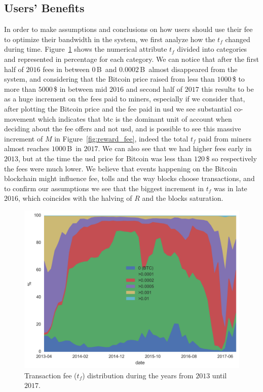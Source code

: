 \documentclass[USenglish]{uit-thesis}
\def\bitcoin{\leavevmode\rlap{\hskip.5pt-}B}
\begin{document}
\subsection{Users' Benefits} %
\label{sec:userbenefits}
In order to make assumptions and conclusions on how
users should use their fee to optimize their bandwidth in
the system, we first analyze how the $t_f$ changed during
time. Figure~\ref{fig:txs_fee_distribution} shows the numerical
attribute $t_f$ divided into categories and
represented in percentage for each category.
We can notice that after the first half of $2016$
fees in between $0$\,\bitcoin~and $0.0002$\,\bitcoin~almost disappeared
from the system, and considering that the Bitcoin price raised
from less than $1000$\,\$ to more than $5000$\,\$ in between
mid $2016$ and second half of $2017$ this results to be
as a huge increment on the fees paid to miners, especially if
we consider that, after plotting the Bitcoin price and the fee paid in
\gls{usd} we see substantial co-movement which indicates
that \gls{btc} is the dominant unit of account when deciding about
the fee offers and not \gls{usd}, and is possible
to see this massive increment of $M$ in Figure~\ref{fig:reward_fee},
indeed the total $t_f$ paid from miners almost reaches
$1000$\,\bitcoin~in $2017$.
We can also see that we had
higher fees early in $2013$, but at the time the \gls{usd}
price for Bitcoin was less than $120$\,\$ so respectively the fees
were much lower. We believe that events happening
on the Bitcoin blockchain might influence fee, tolls and
the way blocks choose transactions, and to confirm
our assumptions we see that the biggest
increment in $t_f$ was in late $2016$, which coincides
with the halving of $R$ and the blocks saturation.
\begin{figure}[h]
	\centering
	\includegraphics[width=1\textwidth]{img/txs_fee_distribution}
	\caption{Transaction fee ($t_f$) distribution during the years from
		$2013$ until $2017$.}
	\label{fig:txs_fee_distribution}
\end{figure}
\end{document}
